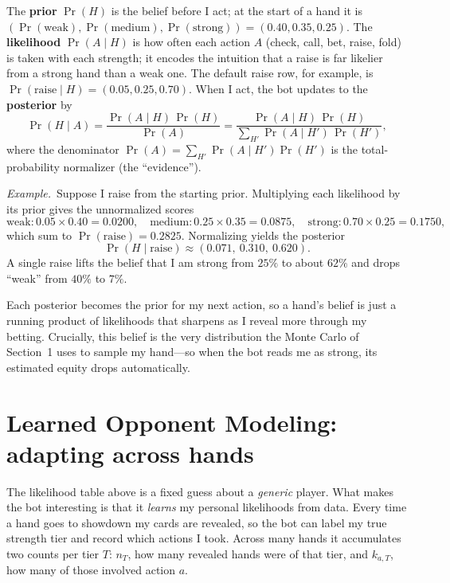 \documentclass[11pt]{article}
\newcommand{\example}[1]{\smallskip\noindent\textit{Example.}\ #1\smallskip}
\begin{document}
The \textbf{prior} $\Pr(H)$ is the belief before I act; at the start of a hand it
is $(\Pr(\text{weak}),\Pr(\text{medium}),\Pr(\text{strong}))=(0.40,0.35,0.25)$.
The \textbf{likelihood} $\Pr(A\mid H)$ is how often each action $A$ (check, call,
bet, raise, fold) is taken with each strength; it encodes the intuition that a
raise is far likelier from a strong hand than a weak one. The default raise row,
for example, is $\Pr(\text{raise}\mid H)=(0.05,0.25,0.70)$. When I act, the bot
updates to the \textbf{posterior} by
\begin{equation}
\Pr(H\mid A)=\frac{\Pr(A\mid H)\,\Pr(H)}{\Pr(A)}
=\frac{\Pr(A\mid H)\,\Pr(H)}{\sum_{H'}\Pr(A\mid H')\,\Pr(H')},
\label{eq:bayes}
\end{equation}
where the denominator $\Pr(A)=\sum_{H'}\Pr(A\mid H')\Pr(H')$ is the
total-probability normalizer (the ``evidence'').

\example{Suppose I raise from the starting prior. Multiplying each likelihood by
its prior gives the unnormalized scores
\[
\text{weak}:0.05\times0.40=0.0200,\quad
\text{medium}:0.25\times0.35=0.0875,\quad
\text{strong}:0.70\times0.25=0.1750,
\]
which sum to $\Pr(\text{raise})=0.2825$. Normalizing yields the posterior
\[
\Pr(H\mid\text{raise})\approx(0.071,\ 0.310,\ 0.620).
\]
A single raise lifts the belief that I am strong from $25\%$ to about $62\%$ and
drops ``weak'' from $40\%$ to $7\%$.}

Each posterior becomes the prior for my next action, so a hand's belief is just a
running product of likelihoods that sharpens as I reveal more through my betting.
Crucially, this belief is the very distribution the Monte Carlo of Section~1 uses
to sample my hand---so when the bot reads me as strong, its estimated equity
drops automatically.

\section{Learned Opponent Modeling: adapting across hands}

The likelihood table above is a fixed guess about a \emph{generic} player. What
makes the bot interesting is that it \emph{learns} my personal likelihoods from
data. Every time a hand goes to showdown my cards are revealed, so the bot can
label my true strength tier and record which actions I took. Across many hands it
accumulates two counts per tier $T$: $n_T$, how many revealed hands were of that
tier, and $k_{a,T}$, how many of those involved action $a$.
\end{document}
